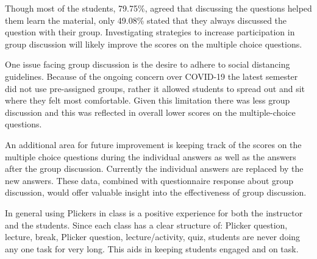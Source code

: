 \documentclass[12pt]{article}
\begin{document}
Though most of the students, 79.75\%, agreed that discussing the questions helped them learn the material, only 49.08\% stated that they always discussed the question with their group. Investigating strategies to increase participation in group discussion will likely improve the scores on the multiple choice questions.

One issue facing group discussion is the desire to adhere to social distancing guidelines. Because of the ongoing concern over COVID-19 the latest semester did not use pre-assigned groups, rather it allowed students to spread out and sit where they felt most comfortable. Given this limitation there was less group discussion and this was reflected in overall lower scores on the multiple-choice questions. 

An additional area for future improvement is keeping track of the scores on the multiple choice questions during the individual answers as well as the answers after the group discussion. Currently the individual answers are replaced by the new answers. These data, combined with questionnaire response about group discussion, would offer valuable insight into the effectiveness of group discussion.

In general using Plickers in class is a positive experience for both the instructor and the students. Since each class has a clear structure of: Plicker question, lecture, break, Plicker question, lecture/activity, quiz, students are never doing any one task for very long. This aids in keeping students engaged and on task.


\vspace{4\baselineskip}\vspace{-\parskip} %
\footnotesize %


\end{document}

